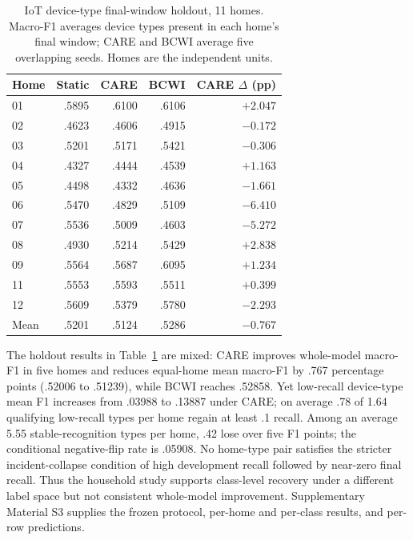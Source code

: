 \documentclass[journal]{IEEEtran}
\newcommand{\ours}{CARE}
\begin{document}
\begin{table}[!t]
\centering
\caption{IoT device-type final-window holdout, 11 homes. Macro-F1 averages device types present in each home's final window; CARE and BCWI average five overlapping seeds. Homes are the independent units.}
\label{tab:iot}
\scriptsize
\setlength{\tabcolsep}{4pt}
\begin{tabular}{@{}lrrrr@{}}
\toprule
Home & Static & CARE & BCWI & CARE $\Delta$ (pp)\\
\midrule
01 & .5895 & .6100 & .6106 & $+2.047$\\
02 & .4623 & .4606 & .4915 & $-0.172$\\
03 & .5201 & .5171 & .5421 & $-0.306$\\
04 & .4327 & .4444 & .4539 & $+1.163$\\
05 & .4498 & .4332 & .4636 & $-1.661$\\
06 & .5470 & .4829 & .5109 & $-6.410$\\
07 & .5536 & .5009 & .4603 & $-5.272$\\
08 & .4930 & .5214 & .5429 & $+2.838$\\
09 & .5564 & .5687 & .6095 & $+1.234$\\
11 & .5553 & .5593 & .5511 & $+0.399$\\
12 & .5609 & .5379 & .5780 & $-2.293$\\
\midrule
Mean & .5201 & .5124 & .5286 & $-0.767$\\
\bottomrule
\end{tabular}
\end{table}

The holdout results in Table~\ref{tab:iot} are mixed: \ours{} improves whole-model macro-F1 in five homes and reduces equal-home mean macro-F1 by .767 percentage points (.52006 to .51239), while BCWI reaches .52858. Yet low-recall device-type mean F1 increases from .03988 to .13887 under \ours{}; on average .78 of 1.64 qualifying low-recall types per home regain at least .1 recall. Among an average 5.55 stable-recognition types per home, .42 lose over five F1 points; the conditional negative-flip rate is .05908. No home-type pair satisfies the stricter incident-collapse condition of high development recall followed by near-zero final recall. Thus the household study supports class-level recovery under a different label space but not consistent whole-model improvement. Supplementary Material S3 supplies the frozen protocol, per-home and per-class results, and per-row predictions.
\end{document}
